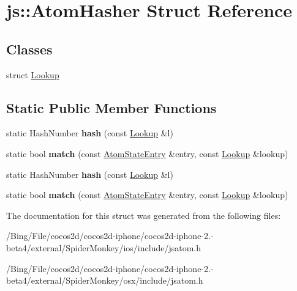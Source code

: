 \hypertarget{structjs_1_1_atom_hasher}{\section{js\-:\-:Atom\-Hasher Struct Reference}
\label{structjs_1_1_atom_hasher}
}
\subsection*{Classes}
\begin{DoxyCompactItemize}
\item 
struct \hyperlink{structjs_1_1_atom_hasher_1_1_lookup}{Lookup}
\end{DoxyCompactItemize}
\subsection*{Static Public Member Functions}
\begin{DoxyCompactItemize}
\item 
\hypertarget{structjs_1_1_atom_hasher_a934163edcc5dcbf5e622f5e0bd97a42c}{static Hash\-Number {\bfseries hash} (const \hyperlink{structjs_1_1_atom_hasher_1_1_lookup}{Lookup} \&l)}\label{structjs_1_1_atom_hasher_a934163edcc5dcbf5e622f5e0bd97a42c}

\item 
\hypertarget{structjs_1_1_atom_hasher_a084e6f4a770f0c60f39bced31b17610e}{static bool {\bfseries match} (const \hyperlink{classjs_1_1_atom_state_entry}{Atom\-State\-Entry} \&entry, const \hyperlink{structjs_1_1_atom_hasher_1_1_lookup}{Lookup} \&lookup)}\label{structjs_1_1_atom_hasher_a084e6f4a770f0c60f39bced31b17610e}

\item 
\hypertarget{structjs_1_1_atom_hasher_a934163edcc5dcbf5e622f5e0bd97a42c}{static Hash\-Number {\bfseries hash} (const \hyperlink{structjs_1_1_atom_hasher_1_1_lookup}{Lookup} \&l)}\label{structjs_1_1_atom_hasher_a934163edcc5dcbf5e622f5e0bd97a42c}

\item 
\hypertarget{structjs_1_1_atom_hasher_a084e6f4a770f0c60f39bced31b17610e}{static bool {\bfseries match} (const \hyperlink{classjs_1_1_atom_state_entry}{Atom\-State\-Entry} \&entry, const \hyperlink{structjs_1_1_atom_hasher_1_1_lookup}{Lookup} \&lookup)}\label{structjs_1_1_atom_hasher_a084e6f4a770f0c60f39bced31b17610e}

\end{DoxyCompactItemize}


The documentation for this struct was generated from the following files\-:\begin{DoxyCompactItemize}
\item 
/\-Bing/\-File/cocos2d/cocos2d-\/iphone/cocos2d-\/iphone-\/2.-\/beta4/external/\-Spider\-Monkey/ios/include/jsatom.\-h\item 
/\-Bing/\-File/cocos2d/cocos2d-\/iphone/cocos2d-\/iphone-\/2.-\/beta4/external/\-Spider\-Monkey/osx/include/jsatom.\-h\end{DoxyCompactItemize}
